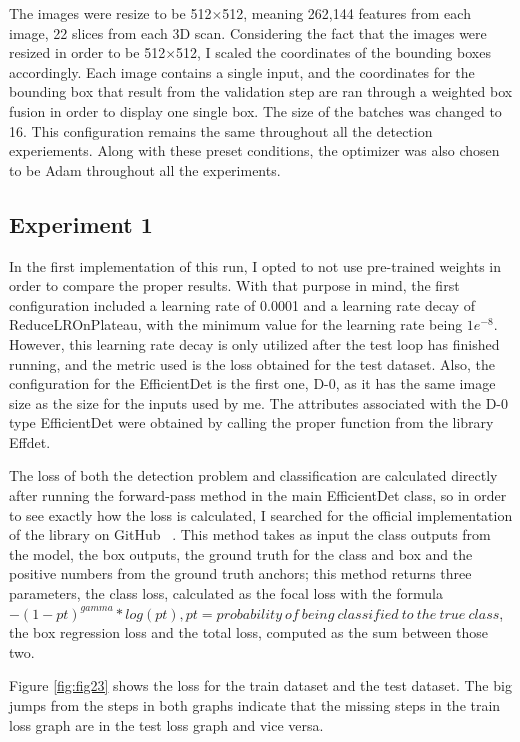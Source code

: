 The images were resize to be 512$\times$512, meaning 262,144 features from each image, 22 slices from each 3D scan. Considering the fact that the images were resized in order to be 512$\times$512, I scaled the coordinates of the bounding boxes
 accordingly. Each image contains a single input, and the coordinates for the bounding box that result from the validation step are ran through a weighted box fusion in order to display one single box. The size of the batches was changed to 16. This configuration remains the same throughout all the detection experiements. Along with these preset conditions, the optimizer was also chosen to be Adam throughout all the experiments.

\subsection{Experiment 1}

In the first implementation of this run, I opted to not use pre-trained weights in order to compare the proper results. With that purpose in mind, the first configuration included a learning rate of 0.0001 and a learning rate decay of ReduceLROnPlateau, with the minimum value for the learning rate being $1e^{-8}$. However, this learning rate decay is only utilized after the test loop has finished running, and the metric used is the loss obtained for the test dataset. Also, the configuration for the EfficientDet is the first one, D-0, as it has the same image size as the size for the inputs used by me. The attributes associated with the D-0 type EfficientDet were obtained by calling the proper function from the library Effdet. 

The loss of both the detection problem and classification are calculated directly after running the forward-pass method in the main EfficientDet class, so in order to see exactly how the loss is calculated, I searched for the official implementation of the library on GitHub ~\cite{link7}. This method takes as input the class outputs from the model, the box outputs, the ground truth for the class and box and the positive numbers from the ground truth anchors; this method returns three parameters, the class loss, calculated as the focal loss with the formula $-(1-pt)^{gamma} * log(pt), pt=probability\ of\ being\ classified\ to\ the\ true\ class$, the box regression loss and the total loss, computed as the sum between those two.

Figure \ref{fig:fig23} shows the loss for the train dataset and the test dataset. The big jumps from the steps in both graphs indicate that the missing steps in the train loss graph are in the test loss graph and vice versa. 

